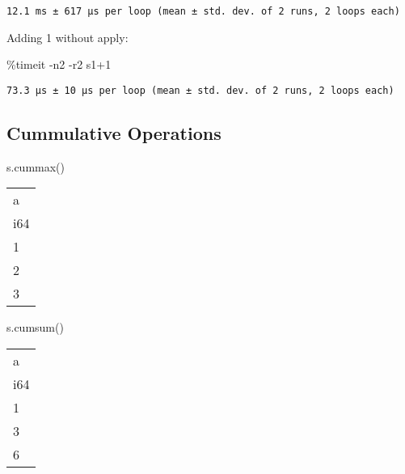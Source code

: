 \documentclass[
  letterpaper,
  DIV=11,
  numbers=noendperiod]{scrartcl}
\newenvironment{Shaded}{\begin{snugshade}}{\end{snugshade}}
\newcommand{\DecValTok}[1]{\textcolor[rgb]{0.68,0.00,0.00}{#1}}
\newcommand{\NormalTok}[1]{\textcolor[rgb]{0.00,0.23,0.31}{#1}}
\newcommand{\OperatorTok}[1]{\textcolor[rgb]{0.37,0.37,0.37}{#1}}
\begin{document}
\begin{verbatim}
12.1 ms ± 617 µs per loop (mean ± std. dev. of 2 runs, 2 loops each)
\end{verbatim}

Adding 1 without apply:

\begin{Shaded}
\begin{Highlighting}[]
\OperatorTok{\%}\NormalTok{timeit }\OperatorTok{{-}}\NormalTok{n2 }\OperatorTok{{-}}\NormalTok{r2 s1}\OperatorTok{+}\DecValTok{1}
\end{Highlighting}
\end{Shaded}

\begin{verbatim}
73.3 µs ± 10 µs per loop (mean ± std. dev. of 2 runs, 2 loops each)
\end{verbatim}

\hypertarget{cummulative-operations}{%
\subsection{Cummulative Operations}\label{cummulative-operations}}

\begin{Shaded}
\begin{Highlighting}[]
\NormalTok{s.cummax()}
\end{Highlighting}
\end{Shaded}

\begin{longtable}[]{@{}l@{}}
\toprule()
a \\
i64 \\
\midrule()
\endhead
1 \\
2 \\
3 \\
\bottomrule()
\end{longtable}

\begin{Shaded}
\begin{Highlighting}[]
\NormalTok{s.cumsum()}
\end{Highlighting}
\end{Shaded}

\begin{longtable}[]{@{}l@{}}
\toprule()
a \\
i64 \\
\midrule()
\endhead
1 \\
3 \\
6 \\
\bottomrule()
\end{longtable}
\end{document}
